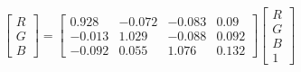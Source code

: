 \begin{equation}
\begin{bmatrix}
  R \\ G \\ B 
\end{bmatrix}=
\left[\begin{matrix}0.928 & -0.072 & -0.083 & 0.09\\ 
-0.013 & 1.029 & -0.088 & 0.092\\ 
-0.092 & 0.055 & 1.076 & 0.132\end{matrix}\right]
\begin{bmatrix}
  R \\ G \\ B \\ 1 
\end{bmatrix}
\end{equation}

